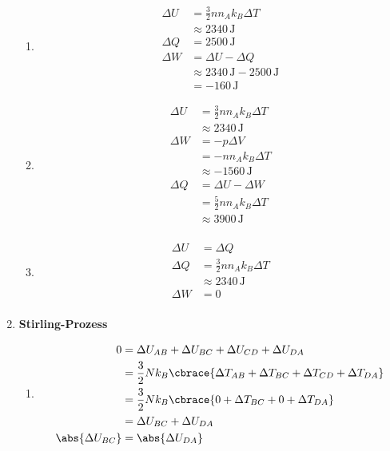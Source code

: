 \documentclass[11pt,letterpaper]{article}
\begin{document}
\begin{enumerate}
\begin{enumerate}
            \item 
            \begin{align*}
                \Delta U &= \frac{3}{2} n n_A k_B \Delta T\\
                &\approx 2340 \,\mathrm{J}\\
                \Delta Q &= 2500\,\mathrm{J}\\
                \Delta W &= \Delta U - \Delta Q\\
                &\approx 2340 \,\mathrm{J} - 2500\,\mathrm{J}\\
                &= -160\,\mathrm{J}
            \end{align*}

            \item 
            \begin{align*}
                \Delta U &= \frac{3}{2} n n_A k_B \Delta T\\
                &\approx 2340 \,\mathrm{J}\\
                \Delta W &= -p\Delta V\\
                &= -n n_A k_B \Delta T\\
                &\approx -1560 \, \mathrm{J}\\
                \Delta Q &= \Delta U - \Delta W\\
                &= \frac{5}{2} n n_A k_B \Delta T\\
                &\approx 3900\,\mathrm{J}\\
            \end{align*}

            \item 
            \begin{align*}
                \Delta U &= \Delta Q\\
                \Delta Q &= \frac{3}{2} n  n_A k_B \Delta T\\
                &\approx 2340 \,\mathrm{J}\\
                \Delta W &= 0\\
            \end{align*}
            
        \end{enumerate}

    \item \textbf{Stirling-Prozess}
        \begin{enumerate}
            \item 
            \begin{align*}
                0 &= \Delta U_{AB} + \Delta U_{BC} + 
                \Delta U_{CD} + \Delta U_{DA}\\
                &= \frac{3}{2}N k_B \cbrace{\Delta T_{AB} + \Delta T_{BC} +
                \Delta T_{CD} + \Delta T_{DA}}\\
                &= \frac{3}{2}N k_B \cbrace{0 + \Delta T_{BC} +
                0 + \Delta T_{DA}}\\
                &= \Delta U_{BC} + \Delta U_{DA}\\
                \abs{\Delta U_{BC}} &= \abs{\Delta U_{DA}}
            \end{align*}


\end{enumerate}
\end{enumerate}
\end{document}
